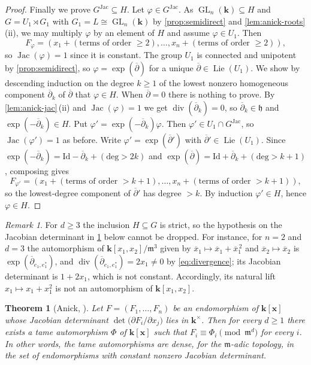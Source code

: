 \documentclass[11pt,letterpaper,reqno]{amsart}
\newtheorem{theorem}{Theorem}[section]
\theoremstyle{remark}
\newtheorem{remark}[remark]{Remark}
\theoremstyle{definition}
\def\M{\mathfrak{m}}
\def\XX{\mathbf{x}}
\newcommand{\KK}[0]{\ensuremath{\mathbf{k}}}
\newcommand{\GL}[0]{\ensuremath{\operatorname{GL}}}
\newcommand{\jac}[0]{\ensuremath{\operatorname{Jac}}}
\newcommand{\divi}[0]{\ensuremath{\operatorname{div}}}
\begin{document}
\begin{proof}
Finally we prove $G^{\jac}\subseteq H$. Let $\varphi\in G^{\jac}$. As $\GL_n(\KK)\subseteq H$ and $G=U_1\rtimes G_1$ with $G_1=L\cong\GL_n(\KK)$ by \cref{prop:semidirect} and \cref{lem:anick-roots}\,\textup{(ii)}, we may multiply $\varphi$ by an element of $H$ and assume $\varphi\in U_1$. Then
\[F_\varphi=(x_1+(\text{terms of order }\geq 2),\dots,x_n+(\text{terms of order }\geq 2)),\]
so $\jac(\varphi)=1$ since it is constant. The group $U_1$ is connected and unipotent by \cref{prop:semidirect}, so $\varphi=\exp(\overline{\partial})$ for a unique $\overline{\partial}\in\operatorname{Lie}(U_1)$. We show by descending induction on the
degree $k\geq1$ of the lowest nonzero homogeneous component $\overline{\partial}_k$ of $\overline{\partial}$ that
$\varphi\in H$. When $\overline{\partial}=0$ there is nothing to prove. By
\cref{lem:anick-jac}\,\textup{(ii)} and $\jac(\varphi)=1$ we get $\divi(\overline{\partial}_k)=0$, so
$\overline{\partial}_k\in\mathfrak h$ and $\exp(-\overline{\partial}_k)\in H$. Put $\varphi'=\exp(-\overline{\partial}_k)\varphi$. Then
$\varphi'\in U_1\cap G^{\jac}$, so $\jac(\varphi')=1$ as before. Write $\varphi'=\exp(\overline{\partial}')$ with $\overline{\partial}'\in\operatorname{Lie}(U_1)$. Since $\exp(-\overline{\partial}_k)=\mathrm{Id}-\overline{\partial}_k+(\text{deg}> 2k)$ and $\exp(\overline{\partial})=\mathrm{Id}+\overline{\partial}_k+(\text{deg}>k+1)$, composing gives
\[F_{\varphi'}=(x_1+(\text{terms of order }> k+1),\dots,x_n+(\text{terms of order }> k+1)),\]
so the lowest-degree component of $\overline{\partial}'$ has degree $>k$. By induction $\varphi'\in H$, hence $\varphi\in H$.

\end{proof}


\begin{remark}\label{rmk:anick-jac-needed}
For $d\geq3$ the inclusion $H\subseteq G$ is strict, so the hypothesis on the Jacobian
determinant in \cref{thm:anick} below cannot be dropped. For instance, for $n=2$ and $d=3$
the automorphism of $\KK[x_1,x_2]/\M^3$ given by
$\overline x_1\mapsto\overline x_1+\overline x_1^{\,2}$ and
$\overline x_2\mapsto\overline x_2$ is $\exp(\overline\partial_{e_1,e_1^*})$, and
$\divi(\overline\partial_{e_1,e_1^*})=2x_1\neq0$ by \eqref{eq:divergence}; its Jacobian
determinant is $1+2x_1$, which is not constant. Accordingly, its natural lift
$x_1\mapsto x_1+x_1^2$ is not an automorphism of $\KK[x_1,x_2]$.
\end{remark}

\begin{theorem}[Anick, {\cite[Theorem~1]{Anick83}}]\label{thm:anick}
Let $F=(F_1,\dots,F_n)$ be an endomorphism of $\KK[\XX]$ whose Jacobian determinant
$\det\bigl(\partial F_i/\partial x_j\bigr)$ lies in $\KK^\times$. Then for every $d\geq1$
there exists a tame automorphism $\Phi$ of $\KK[\XX]$ such that
$F_i\equiv\Phi_i\pmod{\M^d}$ for every $i$. In other words, the tame automorphisms are
dense, for the $\M$-adic topology, in the set of endomorphisms with constant nonzero
Jacobian determinant.
\end{theorem}
\end{document}
